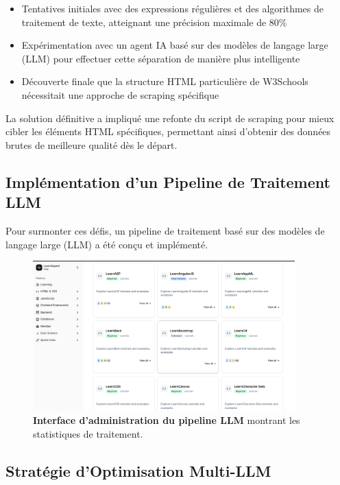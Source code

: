 \begin{itemize}
  \item Tentatives initiales avec des expressions régulières et des algorithmes de traitement de texte, atteignant une précision maximale de 80\%
  \item Expérimentation avec un agent IA basé sur des modèles de langage large (LLM) pour effectuer cette séparation de manière plus intelligente
  \item Découverte finale que la structure HTML particulière de W3Schools nécessitait une approche de scraping spécifique
\end{itemize}

La solution définitive a impliqué une refonte du script de scraping pour mieux cibler les éléments HTML spécifiques, permettant ainsi d'obtenir des données brutes de meilleure qualité dès le départ.

\subsection{Implémentation d'un Pipeline de Traitement LLM}

Pour surmonter ces défis, un pipeline de traitement basé sur des modèles de langage large (LLM) a été conçu et implémenté.

\begin{figure}[h!]
  \centering
  \includegraphics[width=0.9\textwidth,keepaspectratio]{week_3_img/Screenshot 2025-05-20 164411.png}
  \caption{\textbf{Interface d'administration du pipeline LLM} montrant les statistiques de traitement.}
  \label{fig:llm_pipeline}
\end{figure}

\subsection{Stratégie d'Optimisation Multi-LLM}

